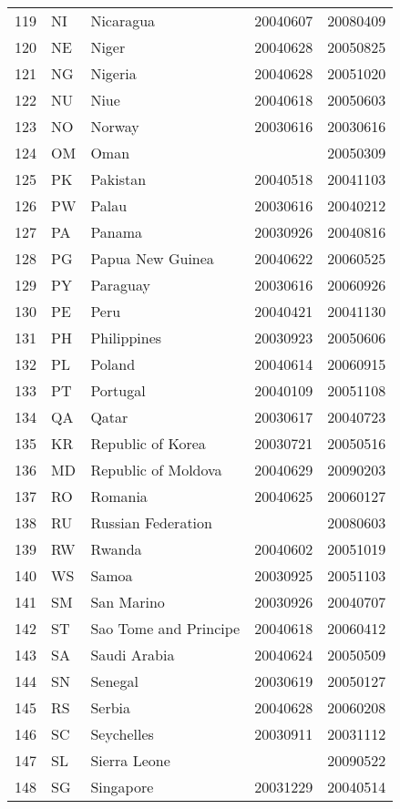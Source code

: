 \begin{longtable}{rllrr}
  119 & NI & Nicaragua & 20040607 & 20080409 \\ 
  120 & NE & Niger & 20040628 & 20050825 \\ 
  121 & NG & Nigeria & 20040628 & 20051020 \\ 
  122 & NU & Niue & 20040618 & 20050603 \\ 
  123 & NO & Norway & 20030616 & 20030616 \\ 
  124 & OM & Oman &  & 20050309 \\ 
  125 & PK & Pakistan & 20040518 & 20041103 \\ 
  126 & PW & Palau & 20030616 & 20040212 \\ 
  127 & PA & Panama & 20030926 & 20040816 \\ 
  128 & PG & Papua New Guinea & 20040622 & 20060525 \\ 
  129 & PY & Paraguay & 20030616 & 20060926 \\ 
  130 & PE & Peru & 20040421 & 20041130 \\ 
  131 & PH & Philippines & 20030923 & 20050606 \\ 
  132 & PL & Poland & 20040614 & 20060915 \\ 
  133 & PT & Portugal & 20040109 & 20051108 \\ 
  134 & QA & Qatar & 20030617 & 20040723 \\ 
  135 & KR & Republic of Korea & 20030721 & 20050516 \\ 
  136 & MD & Republic of Moldova & 20040629 & 20090203 \\ 
  137 & RO & Romania & 20040625 & 20060127 \\ 
  138 & RU & Russian Federation &  & 20080603 \\ 
  139 & RW & Rwanda & 20040602 & 20051019 \\ 
  140 & WS & Samoa & 20030925 & 20051103 \\ 
  141 & SM & San Marino & 20030926 & 20040707 \\ 
  142 & ST & Sao Tome and Principe & 20040618 & 20060412 \\ 
  143 & SA & Saudi Arabia & 20040624 & 20050509 \\ 
  144 & SN & Senegal & 20030619 & 20050127 \\ 
  145 & RS & Serbia & 20040628 & 20060208 \\ 
  146 & SC & Seychelles & 20030911 & 20031112 \\ 
  147 & SL & Sierra Leone &  & 20090522 \\ 
  148 & SG & Singapore & 20031229 & 20040514 \\ 

\end{longtable}
